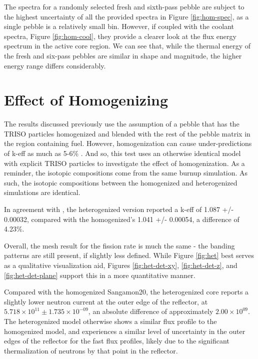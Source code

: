 The spectra for a randomly selected fresh and sixth-pass pebble are subject to the highest uncertainty of all the provided spectra in Figure \ref{fig:hom-spec}, as a single pebble is a relatively small bin.  However, if coupled with the coolant spectra, Figure \ref{fig:hom-cool}, they provide a clearer look at the flux energy spectrum in the active core region.  We can see that, while the thermal energy of the fresh and six-pass pebbles are similar in shape and magnitude, the higher energy range differs considerably.


\section{Effect of Homogenizing}

The results discussed previously use the assumption of a pebble that has the TRISO particles homogenized and blended with the rest of the pebble matrix in the region containing fuel.  However, homogenization can cause under-predictions of k-eff as much as 5-6\% \cite{brown_stochastic_2005}.  And so, this test uses an otherwise identical model with explicit TRISO particles to investigate the effect of homogenization.  As a reminder, the isotopic compositions come from the same burnup simulation.  As such, the isotopic compositions between the homogenized and heterogenized simulations are identical.





In agreement with \cite{brown_stochastic_2005}, the heterogenized version reported a k-eff of 1.087 +/- 0.00032, compared with the homogenized's 1.041 +/- 0.00054, a difference of 4.23\%.  

Overall, the mesh result for the fission rate is much the same - the banding patterns are still present, if slightly less defined.  While Figure \ref{fig:het} best serves as a qualitative visualization aid, Figures \ref{fig:het-det-xy}, \ref{fig:het-det-z}, and \ref{fig:het-det-plane} support this in a more quantitative manner.





Compared with the homogenized Sangamon20, the heterogenized core reports a slightly lower neutron current at the outer edge of the reflector, at $5.718\times10^{11} \pm 1.735\times10^{-09}$, an absolute difference of approximately $2.00\times10^{09}$.  The heterogenized model otherwise shows a similar flux profile to the homogenized model, and experiences a similar level of uncertainty in the outer edges of the reflector for the fast flux profiles, likely due to the significant thermalization of neutrons by that point in the reflector.


